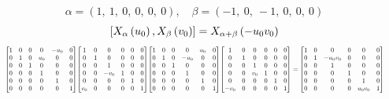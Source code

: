 \documentclass[11pt]{article}
\theoremstyle{definition}
\begin{document}
\[
\alpha = \left( 1, \  1, \  0, \  0, \  0, \  0\right), \quad \beta = \left( -1, \  0, \  -1, \  0, \  0, \  0\right)
\]
\[
\scaletoalign{\textwidth}{\left[ X_{\alpha}\left(u_{0}\right), X_{\beta}\left(v_{0}\right) \right] = X_{\alpha + \beta}\left(- u_{0} v_{0}\right)}
\]
\[
\scaletoalign{\textwidth}{{\left[\begin{matrix}1 & 0 & 0 & 0 & - u_{0} & 0\\0 & 1 & 0 & u_{0} & 0 & 0\\0 & 0 & 1 & 0 & 0 & 0\\0 & 0 & 0 & 1 & 0 & 0\\0 & 0 & 0 & 0 & 1 & 0\\0 & 0 & 0 & 0 & 0 & 1\end{matrix}\right]} {\left[\begin{matrix}1 & 0 & 0 & 0 & 0 & 0\\0 & 1 & 0 & 0 & 0 & 0\\0 & 0 & 1 & 0 & 0 & 0\\0 & 0 & - v_{0} & 1 & 0 & 0\\0 & 0 & 0 & 0 & 1 & 0\\v_{0} & 0 & 0 & 0 & 0 & 1\end{matrix}\right]} {\left[\begin{matrix}1 & 0 & 0 & 0 & u_{0} & 0\\0 & 1 & 0 & - u_{0} & 0 & 0\\0 & 0 & 1 & 0 & 0 & 0\\0 & 0 & 0 & 1 & 0 & 0\\0 & 0 & 0 & 0 & 1 & 0\\0 & 0 & 0 & 0 & 0 & 1\end{matrix}\right]} {\left[\begin{matrix}1 & 0 & 0 & 0 & 0 & 0\\0 & 1 & 0 & 0 & 0 & 0\\0 & 0 & 1 & 0 & 0 & 0\\0 & 0 & v_{0} & 1 & 0 & 0\\0 & 0 & 0 & 0 & 1 & 0\\- v_{0} & 0 & 0 & 0 & 0 & 1\end{matrix}\right]} = {\left[\begin{matrix}1 & 0 & 0 & 0 & 0 & 0\\0 & 1 & - u_{0} v_{0} & 0 & 0 & 0\\0 & 0 & 1 & 0 & 0 & 0\\0 & 0 & 0 & 1 & 0 & 0\\0 & 0 & 0 & 0 & 1 & 0\\0 & 0 & 0 & 0 & u_{0} v_{0} & 1\end{matrix}\right]}}
\]
\end{document}
